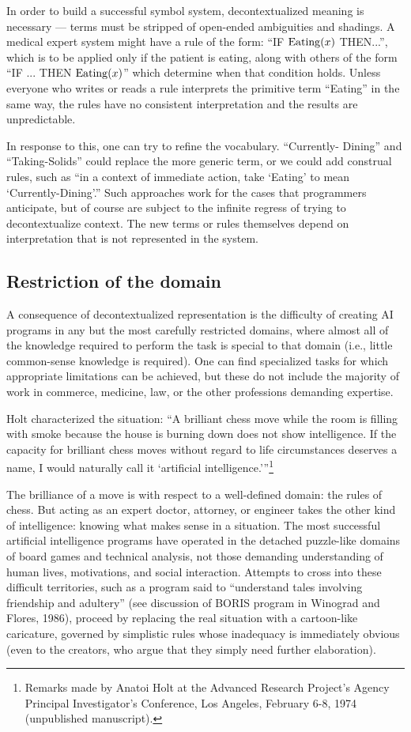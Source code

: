 \documentclass[12pt]{article}
\begin{document}
In order to build a successful symbol system, decontextualized meaning is necessary --- terms must be stripped of open-ended ambiguities and shadings. A medical expert system might have a rule of the form: ``IF $\mathop{\rm Eating}(x)$ THEN...'', which is to be applied only if the patient is eating, along with others of the form ``IF ... THEN $\mathop{\rm Eating}(x)$'' which determine when that condition holds. Unless everyone who writes or reads a rule interprets the primitive term ``Eating'' in the same way, the rules have no consistent interpretation and the results are unpredictable.

In response to this, one can try to refine the vocabulary. ``Currently- Dining'' and ``Taking-Solids'' could replace the more generic term, or we could add construal rules, such as ``in a context of immediate action, take ‘Eating’ to mean ‘Currently-Dining’.'' Such approaches work for the cases that programmers anticipate, but of course are subject to the infinite regress of trying to decontextualize context. The new terms or rules themselves depend on interpretation that is not represented in the system.

\subsection{Restriction of the domain}

A consequence of decontextualized representation is the difficulty of creating AI programs in any but the most carefully restricted domains, where almost all of the knowledge required to perform the task is special to that domain (i.e., little common-sense knowledge is required). One can find specialized tasks for which appropriate limitations can be achieved, but these do not include the majority of work in commerce, medicine, law, or the other professions demanding expertise.

Holt characterized the situation: ``A brilliant chess move while the room is filling with smoke because the house is burning down does not show intelligence. If the capacity for brilliant chess moves without regard to life circumstances deserves a name, I would naturally call it ‘artificial intelligence.’''\footnote{Remarks made by Anatoi Holt at the Advanced Research Project’s Agency
Principal Investigator’s Conference, Los Angeles, February 6-8, 1974
(unpublished manuscript).}

The brilliance of a move is with respect to a well-defined domain: the rules of chess. But acting as an expert doctor, attorney, or engineer takes the other kind of intelligence: knowing what makes sense in a situation. The most successful artificial intelligence programs have operated in the detached puzzle-like domains of board games and technical analysis, not those demanding understanding of human lives, motivations, and social interaction. Attempts to cross into these difficult territories, such as a program said to ``understand tales involving friendship and adultery'' (see discussion of BORIS program in Winograd and Flores, 1986), proceed by replacing the real situation with a cartoon-like caricature, governed by simplistic rules whose inadequacy is immediately obvious (even to the creators, who argue that they simply need further elaboration).
\end{document}
